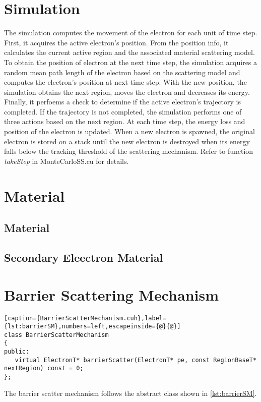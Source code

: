 \section{Simulation}\label{impl:sim}
The simulation computes the movement of the electron for each unit of time step. First, it acquires the active electron's position. From the position info, it calculates the current active region and the associated material scattering model. To obtain the position of electron at the next time step, the simulation acquires a random mean path length of the electron based on the scattering model and computes the electron's position at next time step. With the new position, the simulation obtains the next region, moves the electron and decreases its energy. Finally, it perfoems a check to determine if the active electron's trajectory is completed. If the trajectory is not completed, the simulation performs one of three actions based on the next region. At each time step, the energy loss and position of the electron is updated. When a new electron is spawned, the original electron is stored on a stack until the new electron is destroyed when its energy falls below the tracking threshold of the scattering mechanism. Refer to function \emph{takeStep} in MonteCarloSS.cu for details. 

\section{Material}\label{impl:mat}
\subsection{Material}
\subsection{Secondary Eleectron Material}

\section{Barrier Scattering Mechanism}\label{impl:barrier_sm}
\begin{lstlisting}[caption={BarrierScatterMechanism.cuh},label={lst:barrierSM},numbers=left,escapeinside={@}{@}]
class BarrierScatterMechanism
{
public:
   virtual ElectronT* barrierScatter(ElectronT* pe, const RegionBaseT* nextRegion) const = 0;
};
\end{lstlisting}

The barrier scatter mechanism follows the abstract class shown in \ref{lst:barrierSM}.


